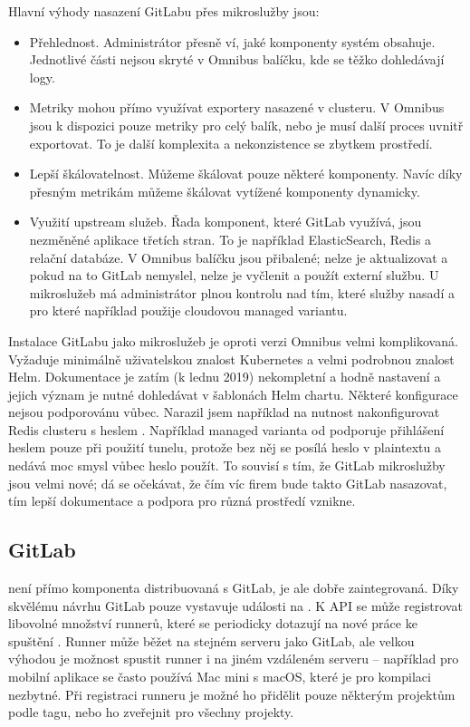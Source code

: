         Hlavní výhody nasazení GitLabu přes mikroslužby jsou:
        \begin{itemize}
            \item Přehlednost. Administrátor přesně ví, jaké komponenty systém obsahuje. Jednotlivé části nejsou skryté v Omnibus balíčku, kde se těžko dohledávají logy.
            \item Metriky mohou přímo využívat exportery nasazené v clusteru. V Omnibus jsou k dispozici pouze metriky pro celý balík, nebo je musí další proces uvnitř exportovat. To je další komplexita a nekonzistence se zbytkem prostředí.
            \item Lepší škálovatelnost. Můžeme škálovat pouze některé komponenty. Navíc díky přesným metrikám můžeme škálovat vytížené komponenty dynamicky.
            \item Využití upstream služeb. Řada komponent, které GitLab využívá, jsou nezměněné aplikace třetích stran. To je například ElasticSearch, Redis a relační databáze. V Omnibus balíčku jsou přibalené; nelze je aktualizovat a pokud na to GitLab nemyslel, nelze je vyčlenit a použít externí službu. U mikroslužeb má administrátor plnou kontrolu nad tím, které služby nasadí a pro které například použije cloudovou managed variantu.
        \end{itemize}

        Instalace GitLabu jako mikroslužeb je oproti verzi Omnibus velmi komplikovaná. Vyžaduje minimálně uživatelskou znalost Kubernetes a velmi podrobnou znalost Helm. Dokumentace je zatím (k lednu 2019) nekompletní a hodně nastavení a jejich význam je nutné dohledávat v šablonách Helm chartu. Některé konfigurace nejsou podporovánu vůbec. Narazil jsem například na nutnost nakonfigurovat Redis clusteru s heslem \cite{gitlab-helm-issue-redis}. Například managed varianta od  podporuje přihlášení heslem pouze při použití  tunelu, protože bez něj se posílá heslo v plaintextu a nedává moc smysl vůbec heslo použít. To souvisí s tím, že GitLab mikroslužby jsou velmi nové; dá se očekávat, že čím víc firem bude takto GitLab nasazovat, tím lepší dokumentace a podpora pro různá prostředí vznikne.

    \subsection{GitLab \CI}
        \CI není přímo komponenta distribuovaná s GitLab, je ale dobře zaintegrovaná. Díky skvělému návrhu GitLab pouze vystavuje události na . K API se může registrovat libovolné množství runnerů, které se periodicky  dotazují na nové práce ke spuštění \cite{gitlab-runner-registration}. Runner může běžet na stejném serveru jako GitLab, ale velkou výhodou je možnost spustit runner i na jiném vzdáleném serveru -- například pro mobilní aplikace se často používá Mac mini s macOS, které je pro kompilaci nezbytné. Při registraci runneru je možné ho přidělit pouze některým projektům podle tagu, nebo ho zveřejnit pro všechny projekty.

